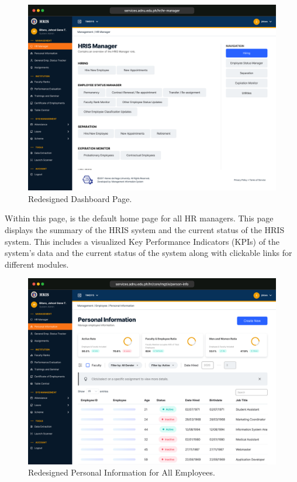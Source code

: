     \begin{figure}[H]
        \centering
        \includegraphics[width=1\linewidth]{figures/app/dashboard.png}
        \caption{Redesigned Dashboard Page.}
        \label{fig:app-manager}
    \end{figure}

    Within this page, is the default home page for all HR managers. This page displays the summary of the HRIS system and the current status of the HRIS system. This includes a visualized Key Performance Indicators (KPIs) of the system's data and the current status of the system along with clickable links for different modules.

    \begin{figure}[H]
        \centering
        \includegraphics[width=1\linewidth]{figures/app/pi.png}
        \caption{Redesigned Personal Information for All Employees.}
        \label{fig:app-pi}
    \end{figure}

